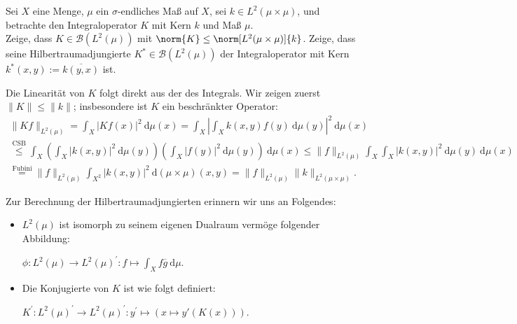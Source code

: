 \begin{exercise}[IO/1]

Sei $X$ eine Menge, $\mu$ ein $\sigma$-endliches Maß auf $X$, sei $k \in L^2(\mu \times \mu)$, und betrachte den Integraloperator $K$ mit Kern $k$ und Maß $\mu$. \\

Zeige, dass $K \in \mathcal{B}(L^2(\mu))$ mit $\norm{K} \leq \norm[L^2(\mu \times \mu)]{k}$.
Zeige, dass seine Hilbertraumadjungierte $K^\ast \in \mathcal{B}(L^2(\mu))$ der Integraloperator mit Kern $k^\ast(x, y) := \overline{k(y, x)}$ ist.

\end{exercise}

\begin{solution}
  Die Linearität von $K$ folgt direkt aus der des Integrals.
  Wir zeigen zuerst $\|K\| \leq \|k\|$; insbesondere ist $K$ ein beschränkter Operator:
  \begin{align}
    \|Kf\|_{L^2(\mu)} = \int_X |Kf(x)|^2 ~\mathrm{d}\mu(x)
    = \int_X \left|\int_X k(x,y) f(y) ~\mathrm{d}\mu(y)\right|^2 ~\mathrm{d}\mu(x) \\
    \stackrel{\text{CSB}}{\leq} \int_X \left(\int_X |k(x,y)|^2  ~\mathrm{d}\mu(y)\right) \left(\int_X |f(y)|^2 ~\mathrm{d}\mu(y)\right)
    ~\mathrm{d}\mu(x) \leq \|f\|_{L^2(\mu)} \int_X \int_X |k(x,y)|^2 ~\mathrm{d}\mu(y) ~\mathrm{d}\mu(x) \\ \stackrel{\text{Fubini}}{=} \|f\|_{L^2(\mu)} \int_{X^2} |k(x,y)|^2 ~\mathrm{d}(\mu\times\mu)(x,y)
    = \|f\|_{L^2(\mu)} \|k\|_{L^2(\mu\times\mu)}.
\end{align}

  Zur Berechnung der Hilbertraumadjungierten erinnern wir uns an Folgendes:

  \begin{itemize}
      \item $L^2(\mu)$ ist isomorph zu seinem eigenen Dualraum vermöge folgender Abbildung:

      $\phi: L^2(\mu) \rightarrow L^2(\mu)^\prime: f \mapsto \int_X f\overline{g} ~\mathrm{d}\mu.$
      \item Die Konjugierte von $K$ ist wie folgt definiert:

      $K^\prime: L^2(\mu)^\prime \rightarrow L^2(\mu)^\prime:
      y^\prime \mapsto (x \mapsto y'(K(x))).$
  \end{itemize}


\end{solution}
